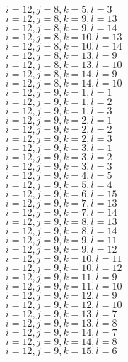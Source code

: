 \documentclass[14pt]{article}
\begin{document}
    $i=12,j=8,k=5,l=3 $ \\ 
    $i=12,j=8,k=9,l=13 $ \\ 
    $i=12,j=8,k=9,l=14 $ \\ 
    $i=12,j=8,k=10,l=13 $ \\ 
    $i=12,j=8,k=10,l=14 $ \\ 
    $i=12,j=8,k=13,l=9 $ \\ 
    $i=12,j=8,k=13,l=10 $ \\ 
    $i=12,j=8,k=14,l=9 $ \\ 
    $i=12,j=8,k=14,l=10 $ \\ 
    $i=12,j=9,k=1,l=1 $ \\ 
    $i=12,j=9,k=1,l=2 $ \\ 
    $i=12,j=9,k=1,l=3 $ \\ 
    $i=12,j=9,k=2,l=1 $ \\ 
    $i=12,j=9,k=2,l=2 $ \\ 
    $i=12,j=9,k=2,l=3 $ \\ 
    $i=12,j=9,k=3,l=1 $ \\ 
    $i=12,j=9,k=3,l=2 $ \\ 
    $i=12,j=9,k=3,l=3 $ \\ 
    $i=12,j=9,k=4,l=5 $ \\ 
    $i=12,j=9,k=5,l=4 $ \\ 
    $i=12,j=9,k=6,l=15 $ \\ 
    $i=12,j=9,k=7,l=13 $ \\ 
    $i=12,j=9,k=7,l=14 $ \\ 
    $i=12,j=9,k=8,l=13 $ \\ 
    $i=12,j=9,k=8,l=14 $ \\ 
    $i=12,j=9,k=9,l=11 $ \\ 
    $i=12,j=9,k=9,l=12 $ \\ 
    $i=12,j=9,k=10,l=11 $ \\ 
    $i=12,j=9,k=10,l=12 $ \\ 
    $i=12,j=9,k=11,l=9 $ \\ 
    $i=12,j=9,k=11,l=10 $ \\ 
    $i=12,j=9,k=12,l=9 $ \\ 
    $i=12,j=9,k=12,l=10 $ \\ 
    $i=12,j=9,k=13,l=7 $ \\ 
    $i=12,j=9,k=13,l=8 $ \\ 
    $i=12,j=9,k=14,l=7 $ \\ 
    $i=12,j=9,k=14,l=8 $ \\ 
    $i=12,j=9,k=15,l=6 $ \\ 
\end{document}
